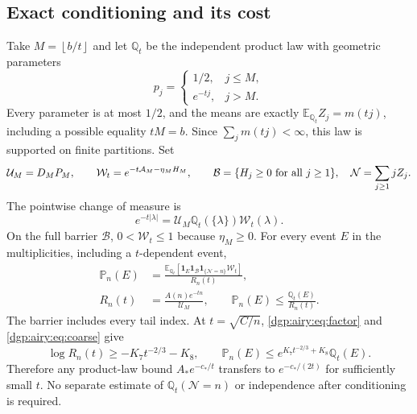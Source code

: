 \documentclass[11pt,letterpaper]{article}
\numberwithin{equation}{section}
\theoremstyle{remark}\newtheorem{remark}[theorem]{Remark}
\newcommand{\PP}{\mathbb P}
\newcommand{\EE}{\mathbb E}
\newcommand{\QQ}{\mathbb Q}
\newcommand{\floor}[1]{\left\lfloor #1\right\rfloor}
\newcommand{\one}{\mathbf 1}
\newcommand{\area}{\mathcal A}
\begin{document}
\subsection{Exact conditioning and its cost}
Take $M=\floor{b/t}$ and let $\QQ_t$ be the independent product law
with geometric parameters
\[
 p_j=\begin{cases}1/2,&j\leq M,\\ e^{-tj},&j>M.\end{cases}
\]
Every parameter is at most $1/2$, and the means are exactly
$\EE_{\QQ_t}Z_j=m(tj)$, including a possible equality $tM=b$.
Since $\sum_jm(tj)<\infty$, this law is supported on finite partitions.
Set
\[
 \mathcal U_M=D_MP_M,\qquad
 \mathcal W_t=e^{-t\area_M-\eta_MH_M},\qquad
 \mathcal B=\{H_j\geq0\ \hbox{for all }j\geq1\},\quad
 \mathcal N=\sum_{j\geq1}jZ_j.
\]
The pointwise change of measure is
\begin{equation}\label{dgp:airy:eq:pointwisecm}
 e^{-t|\lambda|}=\mathcal U_M\QQ_t(\{\lambda\})
                      \mathcal W_t(\lambda).
\end{equation}
On the full barrier $\mathcal B$, $0<\mathcal W_t\leq1$ because
$\eta_M\geq0$. For every event $E$ in the multiplicities,
including a $t$-dependent event,
\begin{align}
 \PP_n(E)&=\frac{\EE_{\QQ_t}[\one_E\one_{\mathcal B}
                          \one_{\{\mathcal N=n\}}\mathcal W_t]}{R_n(t)},
                                                        \label{dgp:airy:eq:decondition}\\
 R_n(t)&=\frac{A(n)e^{-tn}}{\mathcal U_M},\qquad
 \PP_n(E)\leq\frac{\QQ_t(E)}{R_n(t)}.\nonumber
\end{align}
The barrier includes every tail index.
At $t=\sqrt{C/n}$, \eqref{dgp:airy:eq:factor} and \eqref{dgp:airy:eq:coarse} give
\begin{equation}\label{dgp:airy:eq:conditioncost}
 \log R_n(t)\geq-K_7t^{-2/3}-K_8,\qquad
 \PP_n(E)\leq e^{K_7t^{-2/3}+K_8}\QQ_t(E).
\end{equation}
Therefore any product-law bound $A_*e^{-c_*/t}$ transfers to
$e^{-c_*/(2t)}$ for sufficiently small $t$.
No separate estimate of $\QQ_t(\mathcal N=n)$ or independence after
conditioning is required.
\end{document}
